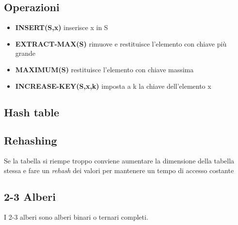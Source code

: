 \documentclass{article}
\begin{document}
\subsection*{Operazioni}
\begin{itemize}
  \item \textbf{INSERT(S,x)} inserisce x in S
  \item \textbf{EXTRACT-MAX(S)} rimuove e restituisce l'elemento con chiave più grande
  \item \textbf{MAXIMUM(S)} restituisce l'elemento con chiave massima
  \item \textbf{INCREASE-KEY(S,x,k)} imposta a k la chiave dell'elemento x
\end{itemize}
\pagebreak

\subsection{Hash table}
\subsection*{Rehashing}
Se la tabella si riempe troppo conviene aumentare la dimensione della tabella stessa e fare un \emph{rehash} dei valori per mantenere un tempo di accesso costante
\pagebreak

\subsection{2-3 Alberi}
I 2-3 alberi sono alberi binari o ternari completi.
\end{document}
